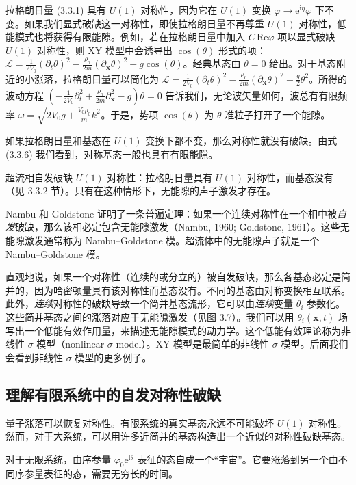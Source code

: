 拉格朗日量 (3.3.1) 具有 $U(1)$ 对称性，因为它在 $U(1)$ 变换 $\varphi \to \mathrm{e}^{\mathrm{i}\eta}\varphi$ 下不变。如果我们显式破缺这一对称性，即使拉格朗日量不再尊重 $U(1)$ 对称性，低能模式也将获得有限能隙。例如，若在拉格朗日量中加入 $C\,\mathrm{Re}\varphi$ 项以显式破缺 $U(1)$ 对称性，则 XY 模型中会诱导出 $\cos(\theta)$ 形式的项：$\mathcal{L} = \frac{1}{2V_0}(\partial_t\theta)^2 - \frac{\rho_0}{2m}(\partial_{\pmb{x}}\theta)^2 + g\cos(\theta)$。经典基态由 $\theta = 0$ 给出。对于基态附近的小涨落，拉格朗日量可以简化为 $\mathcal{L} = \frac{1}{2V_0}(\partial_t\theta)^2 - \frac{\rho_0}{2m}(\partial_{\pmb{x}}\theta)^2 - \frac{g}{2}\theta^2$。所得的波动方程 $(-\frac{1}{2V_0}\partial_t^2 + \frac{\rho_0}{2m}\partial_{\pmb{x}}^2 - g)\theta = 0$ 告诉我们，无论波矢量如何，波总有有限频率 $\omega = \sqrt{2V_0g + \frac{V_0\rho_0}{m}k^2}$。于是，势项 $\cos(\theta)$ 为 $\theta$ 准粒子打开了一个能隙。

如果拉格朗日量和基态在 $U(1)$ 变换下都不变，那么对称性就没有破缺。由式 (3.3.6) 我们看到，对称基态一般也具有有限能隙。


超流相自发破缺 $U(1)$ 对称性：拉格朗日量具有 $U(1)$ 对称性，而基态没有（见 3.3.2 节）。只有在这种情形下，无能隙的声子激发才存在。

Nambu 和 Goldstone 证明了一条普遍定理：如果一个连续对称性在一个相中被\emph{自发}破缺，那么该相必定包含无能隙激发（Nambu, 1960; Goldstone, 1961）。这些无能隙激发通常称为 Nambu–Goldstone 模。超流体中的无能隙声子就是一个 Nambu–Goldstone 模。

直观地说，如果一个对称性（连续的或分立的）被自发破缺，那么各基态必定是简并的，因为哈密顿量具有该对称性而基态没有。不同的基态由对称变换相互联系。此外，\emph{连续}对称性的破缺导致一个简并基态流形，它可以由\emph{连续}变量 $\theta_i$ 参数化。这些简并基态之间的涨落对应于无能隙激发（见图 3.7）。我们可以用 $\theta_i(\pmb{x},t)$ 场写出一个低能有效作用量，来描述无能隙模式的动力学。这个低能有效理论称为非线性 $\sigma$ 模型（nonlinear $\sigma$-model）。XY 模型是最简单的非线性 $\sigma$ 模型。后面我们会看到非线性 $\sigma$ 模型的更多例子。

\subsection{理解有限系统中的自发对称性破缺}

\begin{keypoints}
\item 量子涨落可以恢复对称性。有限系统的真实基态永远不可能破坏 $U(1)$ 对称性。然而，对于大系统，可以用许多近简并的基态构造出一个近似的对称性破缺基态。
\item 对于无限系统，由序参量 $\varphi_0\mathrm{e}^{\mathrm{i}\theta}$ 表征的态自成一个“宇宙”。它要涨落到另一个由不同序参量表征的态，需要无穷长的时间。
\end{keypoints}

